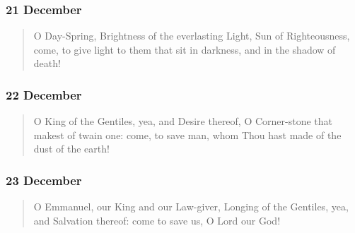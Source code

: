 \subsubsection*{21 December}

\begin{quote}
\par
\end{quote}

\begin{quote}
O Day-Spring, Brightness of the everlasting Light, Sun of Righteousness, come, to give light to them that sit in darkness, and in the shadow of death!\par
\end{quote}

\subsubsection*{22 December}

\begin{quote}
\par
\end{quote}

\begin{quote}
O King of the Gentiles, yea, and Desire thereof, O Corner-stone that makest of twain one: come, to save man, whom Thou hast made of the dust of the earth!\par
\end{quote}

\subsubsection*{23 December}

\begin{quote}
\par
\end{quote}

\begin{quote}
O Emmanuel, our King and our Law-giver, Longing of the Gentiles, yea, and Salvation thereof: come to save us, O Lord our God!\par
\end{quote}

